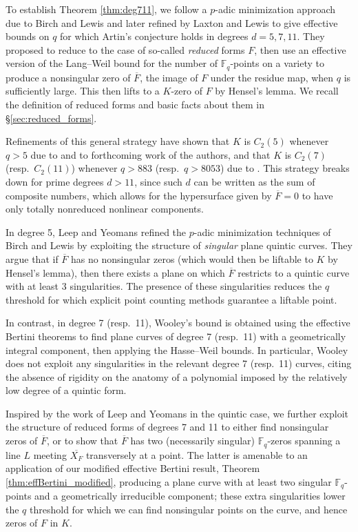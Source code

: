 \documentclass{amsart}
\newcommand{\F}{\mathbb{F}}
\theoremstyle{definition}
\numberwithin{equation}{section}
\numberwithin{table}{section}
\newcommand{\qbound}[1]{{\color{cyan}$q > {#1}$}}
\renewcommand{\qbound}[1]{{$q > {#1}$}}
\begin{document}
To establish Theorem \ref{thm:deg711}, we follow a $p$-adic minimization approach due to Birch and Lewis \cite{BirchLewis1959} and later refined by Laxton and Lewis \cite{LaxtonLewis1965} to give effective bounds on $q$ for which Artin's conjecture holds in degrees $d = 5, 7, 11$. They proposed to reduce to the case of so-called \textit{reduced} forms $F$, then use an effective version of the Lang--Weil bound for the number of $\F_q$-points on a variety to produce a nonsingular zero of $\overline{F}$, the image of $F$ under the residue map, when $q$ is sufficiently large. This then lifts to a $K$-zero of $F$ by Hensel's lemma. We recall the definition of reduced forms and basic facts about them in \S \ref{sec:reduced_forms}.

Refinements of this general strategy have shown that $K$ is $C_2(5)$ whenever \qbound{5} due to \cite{LeepYeomans1996_quintic_forms, HeathBrown2010_p-adic_zeros, Dumke2017} and to forthcoming work of the authors, and that $K$ is $C_2(7)$ (resp.\ $C_2(11)$) whenever \qbound{883} (resp.\ \qbound{8053}) due to \cite{Knapp2001, Wooley2008_7ic_11ic}. This strategy breaks down for prime degrees $d > 11$, since such $d$ can be written as the sum of composite numbers, which allows for the hypersurface given by $\overline{F}=0$ to have only totally nonreduced nonlinear components.

In degree 5, Leep and Yeomans \cite{LeepYeomans1996_quintic_forms} refined the $p$-adic minimization techniques of Birch and Lewis by exploiting the structure of \textit{singular} plane quintic curves. They argue that if $\overline{F}$ has no nonsingular zeros (which would then be liftable to $K$ by Hensel's lemma), then there exists a plane on which $\overline{F}$ restricts to a quintic curve with at least 3 singularities. The presence of these singularities reduces the $q$ threshold for which explicit point counting methods guarantee a liftable point. 

In contrast, in degree 7 (resp.\ 11), Wooley's bound \cite[Theorem 1]{Wooley2008_7ic_11ic} is obtained using the effective Bertini theorems \cite[Corollaries 3.2, 3.4]{CafureMatera} to find plane curves of degree 7 (resp.\ 11) with a geometrically integral component, then applying the Hasse--Weil bounds. In particular, Wooley does not exploit any singularities in the relevant degree 7 (resp.\ 11) curves, citing the absence of rigidity on the anatomy of a polynomial imposed by the relatively low degree of a quintic form.

Inspired by the work of Leep and Yeomans in the quintic case, we further exploit the structure of reduced forms of degrees 7 and 11 to either find nonsingular zeros of $\overline{F}$, or to show that $\overline{F}$ has two (necessarily singular) $\F_q$-zeros spanning a line $L$ meeting $\overline{X_F}$ transversely at a point. The latter is amenable to an application of our modified effective Bertini result, Theorem \ref{thm:effBertini_modified}, producing a plane curve with at least two singular $\F_q$-points and a geometrically irreducible component; these extra singularities lower the $q$ threshold for which we can find nonsingular points on the curve, and hence zeros of $F$ in $K$.
\end{document}
